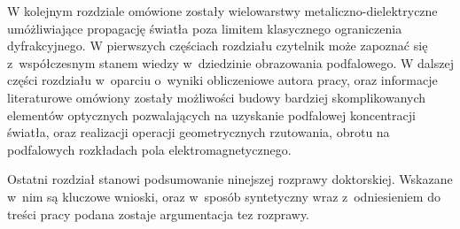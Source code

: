 W kolejnym rozdziale omówione zostały wielowarstwy metaliczno-dielektryczne umóżliwiające propagację światła poza limitem klasycznego ograniczenia dyfrakcyjnego. W pierwszych częściach rozdziału czytelnik może zapoznać się z~współczesnym stanem wiedzy w~dziedzinie obrazowania podfalowego. W dalszej części rozdziału w~oparciu o~wyniki obliczeniowe autora pracy, oraz informacje literaturowe omówiony zostały możliwości budowy bardziej skomplikowanych elementów optycznych pozwalających na uzyskanie podfalowej koncentracji światła, oraz realizacji operacji geometrycznych rzutowania, obrotu na podfalowych rozkładach pola elektromagnetycznego.

Ostatni rozdział stanowi podsumowanie ninejszej rozprawy doktorskiej. Wskazane w~nim są kluczowe wnioski, oraz w~sposób syntetyczny wraz z~odniesieniem do treści pracy podana zostaje argumentacja tez rozprawy. 
